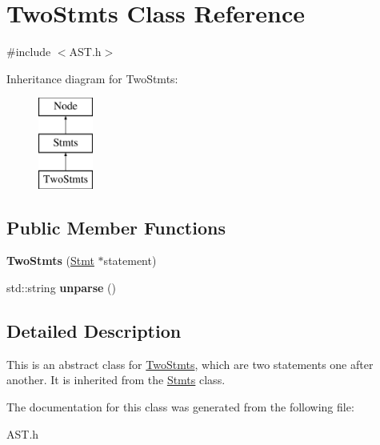 \hypertarget{class_two_stmts}{}\section{Two\+Stmts Class Reference}
\label{class_two_stmts}


{\ttfamily \#include $<$A\+S\+T.\+h$>$}

Inheritance diagram for Two\+Stmts\+:\begin{figure}[H]
\begin{center}
\leavevmode
\includegraphics[height=3.000000cm]{class_two_stmts}
\end{center}
\end{figure}
\subsection*{Public Member Functions}
\begin{DoxyCompactItemize}
\item 
\hypertarget{class_two_stmts_ab9b2fda27bb4186c25089ea00f6769a5}{}{\bfseries Two\+Stmts} (\hyperlink{class_stmt}{Stmt} $\ast$statement)\label{class_two_stmts_ab9b2fda27bb4186c25089ea00f6769a5}

\item 
\hypertarget{class_two_stmts_a453d846a155468b8998d9dc6c3c72555}{}std\+::string {\bfseries unparse} ()\label{class_two_stmts_a453d846a155468b8998d9dc6c3c72555}

\end{DoxyCompactItemize}


\subsection{Detailed Description}
This is an abstract class for \hyperlink{class_two_stmts}{Two\+Stmts}, which are two statements one after another. It is inherited from the \hyperlink{class_stmts}{Stmts} class. 

The documentation for this class was generated from the following file\+:\begin{DoxyCompactItemize}
\item 
A\+S\+T.\+h\end{DoxyCompactItemize}
